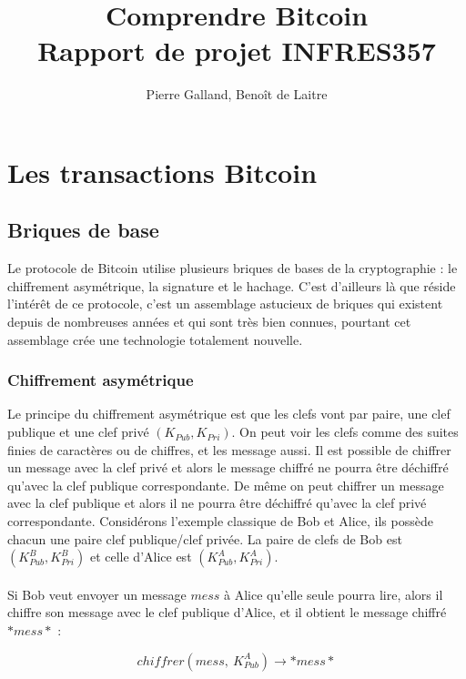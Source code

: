 \documentclass[11pt,a4paper]{article}
\title{Comprendre Bitcoin\\
Rapport de projet INFRES357
}
\author{Pierre Galland, Benoît de Laitre}
\begin{document}
\maketitle

\tableofcontents
 \nocite{*}
 
\newpage

\section{Les transactions Bitcoin}

\subsection{Briques de base}

Le protocole de Bitcoin utilise plusieurs briques de bases de la cryptographie : le chiffrement asymétrique, la signature et le hachage. C'est d'ailleurs là que réside l'intérêt de ce protocole, c'est un assemblage astucieux de briques qui existent depuis de nombreuses années et qui sont très bien connues, pourtant cet assemblage crée une technologie totalement nouvelle.

\subsubsection{Chiffrement asymétrique}

Le principe du chiffrement asymétrique est que les clefs vont par paire, une clef publique et une clef privé $(K_{Pub}, K_{Pri})$. On peut voir les clefs comme des suites finies de caractères ou de chiffres, et les message aussi. Il est possible de chiffrer un message avec la clef privé et alors le message chiffré ne pourra être déchiffré qu'avec la clef publique correspondante. De même on peut chiffrer un message avec la clef publique et alors il ne pourra être déchiffré qu'avec la clef privé correspondante. Considérons l'exemple classique de Bob et Alice, ils possède chacun une paire clef publique/clef privée. La paire de clefs de Bob est 
$(K_{Pub}^{B}, K_{Pri}^{B})$ et celle d'Alice est $(K_{Pub}^{A}, K_{Pri}^{A})$.\\\\

Si Bob veut envoyer un message $mess$ à Alice qu'elle seule pourra lire, alors il chiffre son message avec le clef publique d'Alice, et il obtient le message chiffré $*mess*$ :

$$chiffrer(mess, ~K_{Pub}^{A}) \rightarrow *mess*$$
\end{document}
